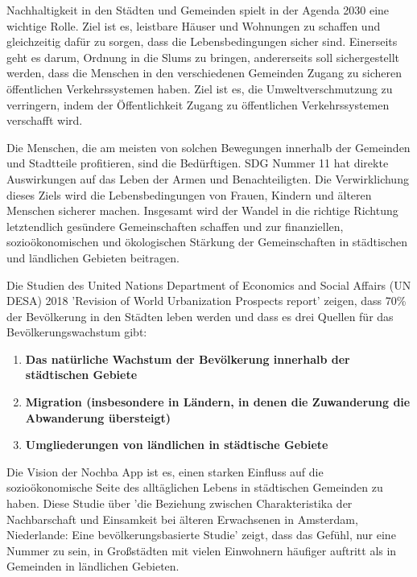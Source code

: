 Nachhaltigkeit in den Städten und Gemeinden spielt in der Agenda 2030 eine wichtige Rolle. Ziel ist es, leistbare Häuser und Wohnungen zu schaffen und gleichzeitig dafür zu sorgen, dass die Lebensbedingungen sicher sind. Einerseits geht es darum, Ordnung in die Slums zu bringen, andererseits soll sichergestellt werden, dass die Menschen in den verschiedenen Gemeinden Zugang zu sicheren öffentlichen Verkehrssystemen haben. Ziel ist es, die Umweltverschmutzung zu verringern, indem der Öffentlichkeit Zugang zu öffentlichen Verkehrssystemen verschafft wird.

Die Menschen, die am meisten von solchen Bewegungen innerhalb der Gemeinden und Stadtteile profitieren, sind die Bedürftigen. SDG Nummer 11 hat direkte Auswirkungen auf das Leben der Armen und Benachteiligten. Die Verwirklichung dieses Ziels wird die Lebensbedingungen von Frauen, Kindern und älteren Menschen sicherer machen. Insgesamt wird der Wandel in die richtige Richtung letztendlich gesündere Gemeinschaften schaffen und zur finanziellen, sozioökonomischen und ökologischen Stärkung der Gemeinschaften in städtischen und ländlichen Gebieten beitragen.

Die Studien des United Nations Department of Economics and Social Affairs (UN DESA) 2018 'Revision of World Urbanization Prospects report' \cite{Worlds-Urbanization-Prospects} zeigen, dass 70\% der Bevölkerung in den Städten leben werden und dass es drei Quellen für das Bevölkerungswachstum gibt:

\begin{enumerate}
    \item \textbf{Das natürliche Wachstum der Bevölkerung innerhalb der städtischen Gebiete}
    \item \textbf{Migration (insbesondere in Ländern, in denen die Zuwanderung die Abwanderung übersteigt)}
    \item \textbf{Umgliederungen von ländlichen in städtische Gebiete}
\end{enumerate}

Die Vision der Nochba App ist es, einen starken Einfluss auf die sozioökonomische Seite des alltäglichen Lebens in städtischen Gemeinden zu haben. Diese Studie über 'die Beziehung zwischen Charakteristika der Nachbarschaft und Einsamkeit bei älteren Erwachsenen in Amsterdam, Niederlande: Eine bevölkerungsbasierte Studie' \cite{neighbourhood-characteristics-and-loneliness} zeigt, dass das Gefühl, nur eine Nummer zu sein, in Großstädten mit vielen Einwohnern häufiger auftritt als in Gemeinden in ländlichen Gebieten.

